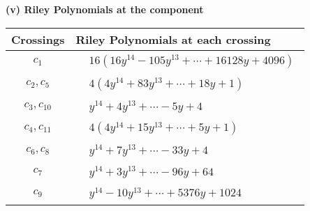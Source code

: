 \documentclass[1p]{elsarticle_modified}
\theoremstyle{definition}
\begin{document}
\flushleft \textbf{(v) Riley Polynomials at the component}\newline \\
\begin{tabular}{m{50pt}|m{274pt}}
Crossings & \hspace{64pt}Riley Polynomials at each crossing \\
\hline $$\begin{aligned}c_{1}\end{aligned}$$&$\begin{aligned}
&16(16 y^{14}-105 y^{13}+\cdots+16128 y+4096)
\end{aligned}$\\
\hline $$\begin{aligned}c_{2},c_{5}\end{aligned}$$&$\begin{aligned}
&4(4 y^{14}+83 y^{13}+\cdots+18 y+1)
\end{aligned}$\\
\hline $$\begin{aligned}c_{3},c_{10}\end{aligned}$$&$\begin{aligned}
&y^{14}+4 y^{13}+\cdots-5 y+4
\end{aligned}$\\
\hline $$\begin{aligned}c_{4},c_{11}\end{aligned}$$&$\begin{aligned}
&4(4 y^{14}+15 y^{13}+\cdots+5 y+1)
\end{aligned}$\\
\hline $$\begin{aligned}c_{6},c_{8}\end{aligned}$$&$\begin{aligned}
&y^{14}+7 y^{13}+\cdots-33 y+4
\end{aligned}$\\
\hline $$\begin{aligned}c_{7}\end{aligned}$$&$\begin{aligned}
&y^{14}+3 y^{13}+\cdots-96 y+64
\end{aligned}$\\
\hline $$\begin{aligned}c_{9}\end{aligned}$$&$\begin{aligned}
&y^{14}-10 y^{13}+\cdots+5376 y+1024
\end{aligned}$\\
\hline
\end{tabular}\\~\\
\end{document}
